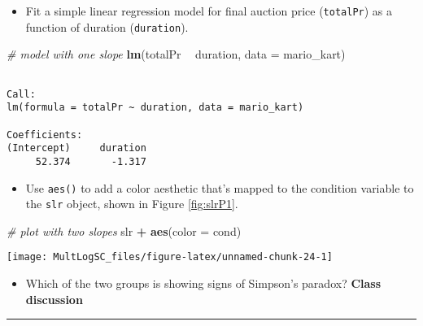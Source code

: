 \documentclass[]{book}
\newenvironment{Shaded}{\begin{snugshade}}{\end{snugshade}}
\newcommand{\KeywordTok}[1]{\textcolor[rgb]{0.13,0.29,0.53}{\textbf{#1}}}
\newcommand{\DataTypeTok}[1]{\textcolor[rgb]{0.13,0.29,0.53}{#1}}
\newcommand{\StringTok}[1]{\textcolor[rgb]{0.31,0.60,0.02}{#1}}
\newcommand{\CommentTok}[1]{\textcolor[rgb]{0.56,0.35,0.01}{\textit{#1}}}
\newcommand{\OperatorTok}[1]{\textcolor[rgb]{0.81,0.36,0.00}{\textbf{#1}}}
\newcommand{\NormalTok}[1]{#1}
\providecommand{\tightlist}{%
  \setlength{\itemsep}{0pt}\setlength{\parskip}{0pt}}
\begin{document}
\begin{itemize}
\tightlist
\item
  Fit a simple linear regression model for final auction price
  (\texttt{totalPr}) as a function of duration (\texttt{duration}).
\end{itemize}

\begin{Shaded}
\begin{Highlighting}[]
\CommentTok{# model with one slope}
\KeywordTok{lm}\NormalTok{(totalPr }\OperatorTok{~}\StringTok{ }\NormalTok{duration, }\DataTypeTok{data =}\NormalTok{ mario_kart)}
\end{Highlighting}
\end{Shaded}

\begin{verbatim}

Call:
lm(formula = totalPr ~ duration, data = mario_kart)

Coefficients:
(Intercept)     duration  
     52.374       -1.317  
\end{verbatim}

\begin{itemize}
\tightlist
\item
  Use \texttt{aes()} to add a color aesthetic that's mapped to the
  condition variable to the \texttt{slr} object, shown in Figure
  \ref{fig:slrP1}.
\end{itemize}

\begin{Shaded}
\begin{Highlighting}[]
\CommentTok{# plot with two slopes}
\NormalTok{slr }\OperatorTok{+}\StringTok{ }\KeywordTok{aes}\NormalTok{(}\DataTypeTok{color =}\NormalTok{ cond)}
\end{Highlighting}
\end{Shaded}

\begin{center}\texttt{[image: MultLogSC\_files/figure-latex/unnamed-chunk-24-1]} \end{center}

\begin{itemize}
\tightlist
\item
  Which of the two groups is showing signs of Simpson's paradox?
  \textbf{Class discussion}
\end{itemize}

\begin{center}\rule{0.5\linewidth}{\linethickness}\end{center}
\end{document}
